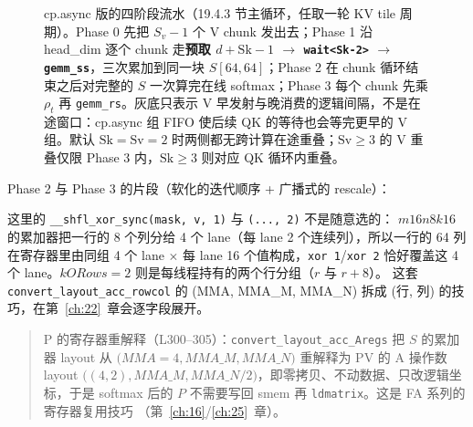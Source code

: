 \begin{figure}[H]
\caption{cp.async 版的四阶段流水（19.4.3 节主循环，任取一轮 KV tile 周期）。Phase 0 先把 $S_v{-}1$ 个 V chunk 发出去；Phase 1 沿 head\_dim 逐个 chunk 走\textbf{预取 $d{+}\mathrm{Sk}{-}1$ $\to$ \texttt{wait<Sk-2>} $\to$ \texttt{gemm\_ss}}，三次累加到同一块 $S[64,64]$；Phase 2 在 chunk 循环结束之后对完整的 $S$ 一次算完在线 softmax；Phase 3 每个 chunk 先乘 $\rho_t$ 再 \texttt{gemm\_rs}。灰底只表示 V 早发射与晚消费的逻辑间隔，不是在途窗口：cp.async 组 FIFO 使后续 QK 的等待也会等完更早的 V 组。默认 $\mathrm{Sk}=\mathrm{Sv}=2$ 时两侧都无跨计算在途重叠；$\mathrm{Sv}\ge3$ 的 V 重叠仅限 Phase 3 内，$\mathrm{Sk}\ge3$ 则对应 QK 循环内重叠。}
\label{fig:19-four-phase}
\end{figure}

Phase 2 与 Phase 3 的片段（软化的迭代顺序 + 广播式的 rescale）：



这里的 \texttt{\_\allowbreak{}\_\allowbreak{}shfl\_\allowbreak{}xor\_\allowbreak{}sync\allowbreak{}(mask,\allowbreak{} v,\allowbreak{} 1)} 与 \texttt{(..., 2)} 不是随意选的：
$m16n8k16$ 的累加器把一行的 8 个列分给 4 个 lane（每 lane 2 个连续列），所以一行的
64 列在寄存器里由同组 4 个 lane $\times$ 每 lane 16 个值构成，\texttt{xor 1}/\texttt{xor 2}
恰好覆盖这 4 个 lane。$kORows = 2$ 则是每线程持有的两个行分组（$r$ 与 $r+8$）。
这套 \texttt{convert\_\allowbreak{}layout\_\allowbreak{}}\allowbreak\texttt{acc\_rowcol} 的 (MMA, MMA\_M, MMA\_N)
拆成 (行, 列) 的技巧，在第~\ref{ch:22}~章会逐字段展开。

\begin{quote}\small
P 的寄存器重解释（L300--305）：\texttt{convert\_\allowbreak{}layout\_\allowbreak{}}\allowbreak\texttt{acc\_Aregs} 把
$S$ 的累加器 layout 从 $(MMA{=}4,$\allowbreak$ MMA\_M,$\allowbreak$ MMA\_N)$ 重解释为 PV 的 A 操作数 layout
$((4,2),$\allowbreak$ MMA\_M,$\allowbreak$ MMA\_N/2)$，即零拷贝、不动数据、只改逻辑坐标，于是 softmax
后的 $P$ 不需要写回 smem 再 \texttt{ldmatrix}。这是 FA 系列的寄存器复用技巧
（第~\ref{ch:16}/\ref{ch:25}~章）。
\end{quote}

